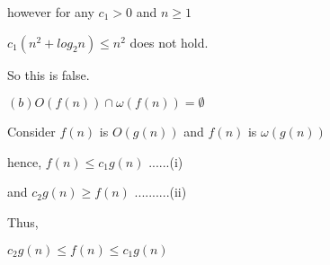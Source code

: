 \documentclass[letterpaper,portrait,12pt]{article}
\begin{document}
\begin{flushleft}
however for any $c_1 \gt 0$ and $n \ge 1$
\end{flushleft}


\begin{flushleft}
$c_1(n^2+log_2n) \le n^2$ does not hold.
\end{flushleft}


\begin{flushleft}
So this is false.
\end{flushleft}


\begin{flushleft}

\end{flushleft}


\begin{flushleft}

\end{flushleft}


\begin{flushleft}

\end{flushleft}


\begin{flushleft}
$(b) O(f (n)) \cap \omega(f (n)) = \emptyset$
\end{flushleft}


\begin{flushleft}

\end{flushleft}


\begin{flushleft}
Consider $f(n) $ is $O(g(n))$ and $f(n) $ is $\omega(g(n))$
\end{flushleft}


\begin{flushleft}
hence, $f(n) \le c_1g(n)$ ......(i)
\end{flushleft}


\begin{flushleft}
and $c_2g(n) \ge f(n)$ ..........(ii) 
\end{flushleft}


\begin{flushleft}

\end{flushleft}


\begin{flushleft}
Thus,
\end{flushleft}


\begin{flushleft}
$c_2g(n)\le f(n) \le c_1g(n)$
\end{flushleft}
\end{document}
